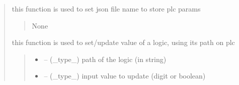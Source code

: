 \documentclass[letterpaper,10pt,english]{sphinxmanual}
\begin{document}
\begin{quote}
\begin{savenotes}
\begin{fulllineitems}
\begin{savenotes}
\begin{fulllineitems}
\begin{quote}
\begin{description}
\end{description}\end{quote}

\end{fulllineitems}\end{savenotes}


\begin{savenotes}\begin{fulllineitems}
\label{\detokenize{setting/backend/plc_managment:oxin.backend.plc_managment.management.set_file_name}}
\pysigstartsignatures
{}
\pysigstopsignatures
\sphinxAtStartPar
this function is used to set json file name to store plc params
\begin{quote}\begin{description}
\sphinxAtStartPar
None

\end{description}\end{quote}

\end{fulllineitems}\end{savenotes}


\begin{savenotes}\begin{fulllineitems}
\label{\detokenize{setting/backend/plc_managment:oxin.backend.plc_managment.management.set_value}}
\pysigstartsignatures
{}
\pysigstopsignatures
\sphinxAtStartPar
this function is used to set/update value of a logic, using its path on plc
\begin{quote}\begin{description}
\begin{itemize}
\item {} 
\sphinxAtStartPar
{} – (\_type\_) path of the logic (in string)

\item {} 
\sphinxAtStartPar
{} – (\_type\_) input value to update (digit or boolean)


\end{itemize}
\end{description}
\end{quote}
\end{fulllineitems}
\end{savenotes}
\end{fulllineitems}
\end{savenotes}
\end{quote}
\end{document}
